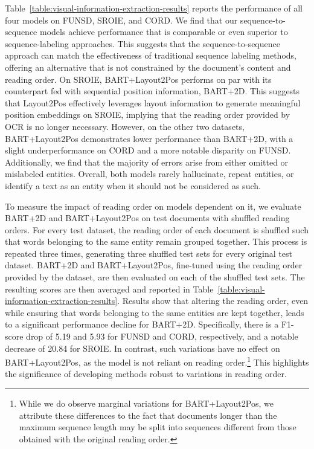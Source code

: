 Table~\ref{table:visual-information-extraction-results} reports the performance of all four models on FUNSD, SROIE, and CORD. We find that our sequence-to-sequence models achieve performance that is comparable or even superior to sequence-labeling approaches. This suggests that the sequence-to-sequence approach can match the effectiveness of traditional sequence labeling methods, offering an alternative that is not constrained by the document's content and reading order. On SROIE, BART+Layout2Pos performs on par with its counterpart fed with sequential position information, BART+2D. This suggests that Layout2Pos effectively leverages layout information to generate meaningful position embeddings on SROIE, implying that the reading order provided by OCR is no longer necessary. However, on the other two datasets, BART+Layout2Pos demonstrates lower performance than BART+2D, with a slight underperformance on CORD and a more notable disparity on FUNSD. Additionally, we find that the majority of errors arise from either omitted or mislabeled entities. Overall, both models rarely hallucinate, repeat entities, or identify a text as an entity when it should not be considered as such. 

To measure the impact of reading order on models dependent on it, we evaluate BART+2D and BART+Layout2Pos on test documents with shuffled reading orders. For every test dataset, the reading order of each document is shuffled such that words belonging to the same entity remain grouped together. This process is repeated three times, generating three shuffled test sets for every original test dataset. BART+2D and BART+Layout2Pos, fine-tuned using the reading order provided by the dataset, are then evaluated on each of the shuffled test sets. The resulting scores are then averaged and reported in Table~\ref{table:visual-information-extraction-results}. Results show that altering the reading order, even while ensuring that words belonging to the same entities are kept together, leads to a significant performance decline for BART+2D. Specifically, there is a F1-score drop of 5.19 and 5.93 for FUNSD and CORD, respectively, and a notable decrease of 20.84 for SROIE. In contrast, such variations have no effect on BART+Layout2Pos, as the model is not reliant on reading order.\footnote{While we do observe marginal variations for BART+Layout2Pos, we attribute these differences to the fact that documents longer than the maximum sequence length may be split into sequences different from those obtained with the original reading order.} This highlights the significance of developing methods robust to variations in reading order.

